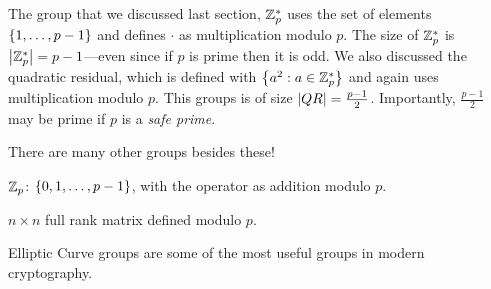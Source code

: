 The group that we discussed last section, $\mathbb{Z}_p^*$ uses the set of elements $\left\{ 1, \ldots, p-1 \right\}$ and defines $\cdot$ as multiplication modulo $p$. The size of $\mathbb{Z}_p^*$ is $\left| \mathbb{Z}_p^* \right| = p-1$---even since if $p$ is prime then it is odd. We also discussed the quadratic residual, which is defined with $\left\{ a^2: a \in \mathbb{Z}_p^* \right\}$ and again uses multiplication modulo $p$. This groups is of size $\left| QR \right| = \tfrac{p-1}{2}$. Importantly, $\tfrac{p-1}{2}$ may be prime if $p$ is a \emph{safe prime}.

There are many other groups besides these!
\begin{compactitem}
\item $\mathbb{Z}_p$: $\left\{ 0, 1, \ldots, p-1 \right\}$, with the operator as addition modulo $p$.
\item $n \times n$ full rank matrix defined modulo $p$.
\item Elliptic Curve groups are some of the most useful groups in modern cryptography.
\end{compactitem}
\fi
